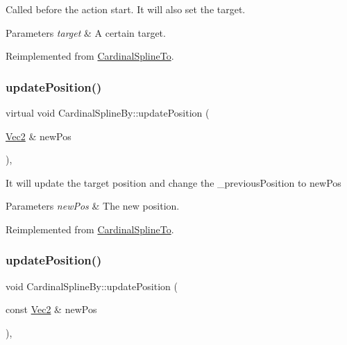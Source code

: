 Called before the action start. It will also set the target.


\begin{DoxyParams}{Parameters}
{\em target} & A certain target. \\
\hline
\end{DoxyParams}


Reimplemented from \hyperlink{classCardinalSplineTo_ab1e28aab8fe748bd90cc370efc52bef5}{Cardinal\+Spline\+To}.

\mbox{\label{classCardinalSplineBy_af49fedd4b7c5ef7c1a8cd58773c5644e}} 
\subsubsection{\texorpdfstring{update\+Position()}{updatePosition()}\hspace{0.1cm}{\footnotesize\ttfamily [1/2]}}
{\footnotesize\ttfamily virtual void Cardinal\+Spline\+By\+::update\+Position (\begin{DoxyParamCaption}\item[{\hyperlink{classVec2}{Vec2} \&}]{new\+Pos }\end{DoxyParamCaption})\hspace{0.3cm}{\ttfamily [override]}, {\ttfamily [virtual]}}

It will update the target position and change the \+\_\+previous\+Position to new\+Pos


\begin{DoxyParams}{Parameters}
{\em new\+Pos} & The new position. \\
\hline
\end{DoxyParams}


Reimplemented from \hyperlink{classCardinalSplineTo_a3ab5cf5c0296a69e675c42293c82a606}{Cardinal\+Spline\+To}.

\mbox{\label{classCardinalSplineBy_ac28d6a528e8d265913b07d74a700cca9}} 
\subsubsection{\texorpdfstring{update\+Position()}{updatePosition()}\hspace{0.1cm}{\footnotesize\ttfamily [2/2]}}
{\footnotesize\ttfamily void Cardinal\+Spline\+By\+::update\+Position (\begin{DoxyParamCaption}\item[{const \hyperlink{classVec2}{Vec2} \&}]{new\+Pos }\end{DoxyParamCaption})\hspace{0.3cm}{\ttfamily [override]}, {\ttfamily [virtual]}}

